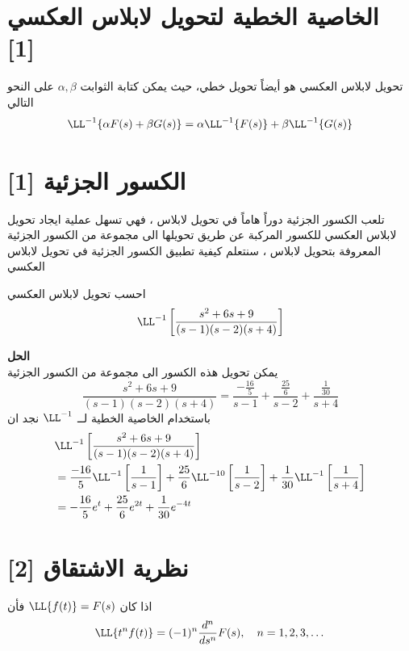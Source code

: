  \section[الخاصية الخطية لتحويل لابلاس العكسي]{الخاصية الخطية لتحويل لابلاس العكسي [1]}
  تحويل لابلاس العكسي هو أيضاً تحويل خطي، حيث يمكن كتابة الثوابت $\alpha, \beta$ على  النحو التالي
  \begin{equation}
  	\LL^{-1} \{\alpha F(s) + \beta G(s)\} = \alpha \LL^{-1} \{F(s)\} + \beta \LL^{-1} \{G(s)\}
  \end{equation}
  
  \section[الكسور الجزئية]{الكسور الجزئية [1]}
 تلعب الكسور الجزئية دوراً هاماً في تحويل لابلاس ، فهي تسهل عملية ايجاد تحويل لابلاس العكسي للكسور المركبة عن طريق تحويلها الى مجموعة من الكسور الجزئية المعروفة بتحويل لابلاس ، سنتعلم كيفية تطبيق الكسور الجزئية في تحويل لابلاس العكسي
 
 \begin{example}
 	احسب تحويل لابلاس العكسي
 	\[
 	\LL^{-1} \left[\frac{s^2 + 6s + 9}{(s-1)(s-2)(s+4)}\right]
 	\]
 \end{example}
 \noindent
 \textbf{الحل}\\
 \noindent
 يمكن تحويل هذه الكسور الى مجموعة من الكسور الجزئية 
 \[
 \frac{s^2 + 6s + 9}{(s-1)(s-2)(s+4)} = \frac{-\frac{16}{5}}{s-1} + \frac{\frac{25}{6}}{s-2} + \frac{\frac{1}{30}}{s+4}
 \]
 باستخدام الخاصية الخطية لــ $\LL^{-1}$ نجد ان 
 \begin{align*}
 	&\LL^{-1} \left[\frac{s^2 + 6s + 9}{(s-1)(s-2)(s+4)}\right]\\
 	 &= \frac{-16}{5}\LL^{-1}\left[\frac{1}{s-1}\right] + \frac{25}{6} \LL^{-10}\left[\frac{1}{s-2}\right] + \frac{1}{30} \LL^{-1}\left[\frac{1}{s+4}\right]\\
 	 &=-\frac{16}{5}e^{t} + \frac{25}{6} e^{2t} + \frac{1}{30 } e^{-4t}
  \end{align*}
  
  \section[نظرية الاشتقاق]{نظرية الاشتقاق [2]}
  \begin{theorem}
  	اذا كان $\LL\{f(t)\} = F(s)$ فأن
  	\[
  	\LL\{t^n f(t)\} = (-1)^n \frac{d^n}{ds^n} F(s), \quad n=1,2,3,\dots
   	\]
  \end{theorem}
  
